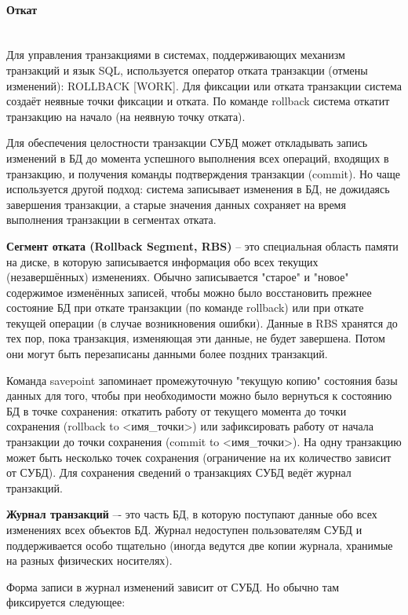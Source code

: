 \paragraph{Откат} ~\\

Для управления транзакциями в системах, поддерживающих механизм транзакций и язык SQL, используется оператор отката транзакции (отмены изменений): ROLLBACK [WORK]. Для фиксации или отката транзакции система создаёт неявные точки фиксации и отката. По команде rollback система откатит транзакцию на начало (на неявную точку отката).

Для обеспечения целостности транзакции СУБД может откладывать запись изменений в БД до момента успешного выполнения всех операций, входящих в транзакцию, и получения команды подтверждения транзакции (commit). Но чаще используется другой подход: система записывает изменения в БД, не дожидаясь завершения транзакции, а старые значения данных сохраняет на время выполнения транзакции в сегментах отката.

\textbf{Сегмент отката (Rollback Segment, RBS)} – это специальная область памяти на диске, в которую записывается информация обо всех текущих (незавершённых) изменениях. Обычно записывается "старое" и "новое" содержимое изменённых записей, чтобы можно было восстановить прежнее состояние БД при откате транзакции (по команде rollback) или при откате текущей операции (в случае возникновения ошибки). Данные в RBS хранятся до тех пор, пока транзакция, изменяющая эти данные, не будет завершена. Потом они могут быть перезаписаны данными более поздних транзакций.


Команда savepoint запоминает промежуточную "текущую копию" состояния базы данных для того, чтобы при необходимости можно было вернуться к состоянию БД в точке сохранения: откатить работу от текущего момента до точки сохранения (rollback to <имя\_точки>) или зафиксировать работу от начала транзакции до точки сохранения (commit to <имя\_точки>). На одну транзакцию может быть несколько точек сохранения (ограничение на их количество зависит от СУБД). Для сохранения сведений о транзакциях СУБД ведёт журнал транзакций. 

\textbf{Журнал транзакций} –- это часть БД, в которую поступают данные обо всех изменениях всех объектов БД. Журнал недоступен пользователям СУБД и поддерживается особо тщательно (иногда ведутся две копии журнала, хранимые на разных физических носителях). 

Форма записи в журнал изменений зависит от СУБД. Но обычно там фиксируется следующее:

